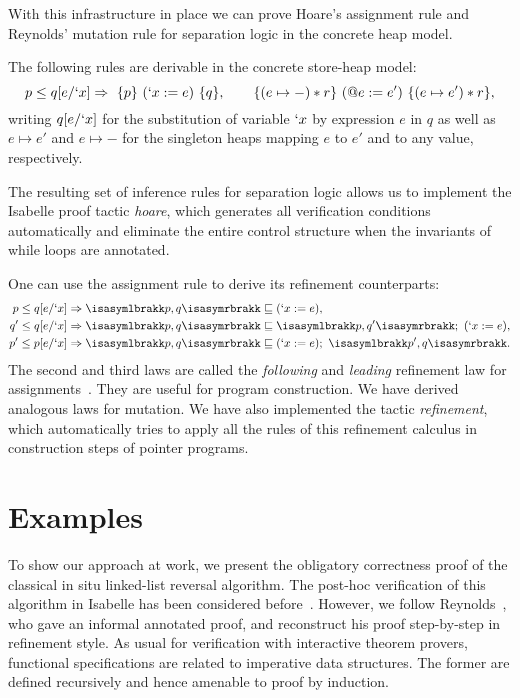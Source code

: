 \documentclass[twoside,runningheads,envcountsame,envcountsect,oribibl,orivec]{llncs}
\newcommand{\triple}[3]{\{#1\}\ #2\ \{#3\}}
\newcommand{\spec}[2]{{\isasymlbrakk}#1, #2{\isasymrbrakk}}
\begin{document}
With this infrastructure in place we can prove Hoare's assignment rule
and Reynolds' mutation rule for separation logic in the concrete heap
model.
\begin{proposition}
  The following rules are derivable in the concrete store-heap model:
\begin{equation*}
	p \le q[e/`x] \Rightarrow\ \triple{p}{(`x := e)}{q}, \qquad
	\triple{(e \mapsto -) * r}{(@e := e')}{(e \mapsto e') * r},
\end{equation*}
writing $q[e/`x]$ for the substitution of variable $`x$ by expression
$e$ in $q$ as well as $e \mapsto e'$ and $e\mapsto -$ for the
singleton heaps mapping $e$ to $e'$ and to any value, respectively.
\end{proposition}

The resulting set of inference rules for separation logic allows us to
implement the Isabelle proof tactic \emph{hoare}, which generates all
verification conditions automatically and eliminate the entire control
structure when the invariants of while loops are annotated.

One can use the assignment rule to derive its refinement counterparts:
\begin{align*}
	p \le q[e/`x] &\Rightarrow \spec{p}{q} \sqsubseteq
		(`x := e), \\
	q' \le q[e/`x] &\Rightarrow \spec{p}{q} \sqsubseteq
		\spec{p}{q'};\ (`x := e), \\
	p' \le p[e/`x] &\Rightarrow \spec{p}{q} \sqsubseteq
		(`x := e);\ \spec{p'}{q}.
\end{align*}
The second and third laws are called the \emph{following} and
\emph{leading} refinement law for assignments~\cite{Mor98}. They are
useful for program construction. We have derived analogous laws for
mutation. We have also implemented the tactic \emph{refinement}, which
automatically tries to apply all the rules of this refinement calculus
in construction steps of pointer programs.




\section{Examples}\label{S:examples}

To show our approach at work, we present the obligatory correctness
proof of the classical in situ linked-list reversal algorithm. The
post-hoc verification of this algorithm in Isabelle has been
considered before~\cite{MehtaN05, Weber04}.  However, we follow
Reynolds~\cite{Reynolds02}, who gave an informal annotated proof, and
reconstruct his proof step-by-step in refinement style. As usual for
verification with interactive theorem provers, functional
specifications are related to imperative data structures. The former
are defined recursively and hence amenable to proof by induction.
\end{document}
